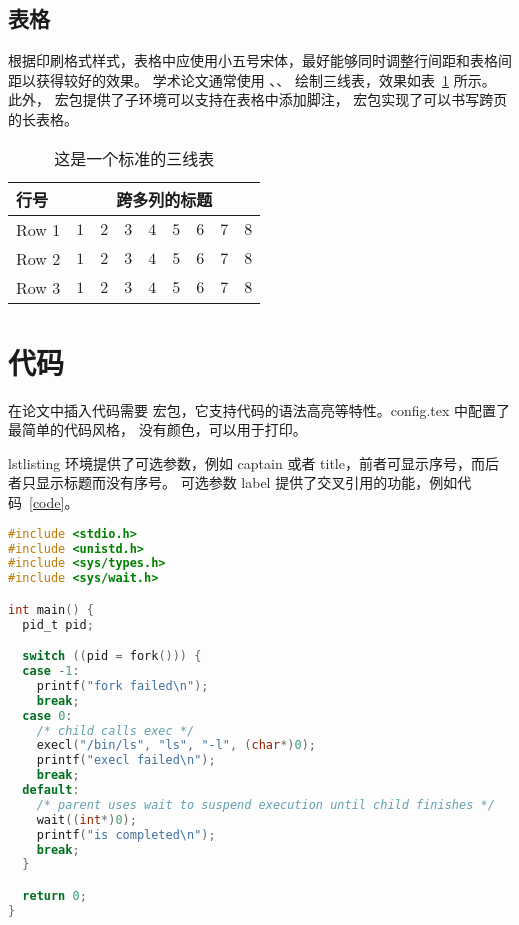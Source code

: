 \subsection{表格}

根据印刷格式样式，表格中应使用小五号宋体，最好能够同时调整行间距和表格间距以获得较好的效果。
学术论文通常使用 、、 绘制三线表，效果如表~\ref{tab:sample} 所示。
此外， 宏包提供了子环境可以支持在表格中添加脚注， 宏包实现了可以书写跨页
的长表格。

\begin{table}[!htbp]
  \caption{这是一个标准的三线表}\label{tab:sample}
  \centering
  \footnotesize%
  \setlength{\tabcolsep}{4pt}%
  \renewcommand{\arraystretch}{1.2}%
  \begin{tabular}{lcccccccc}
      \toprule
      行号 & \multicolumn{8}{c}{跨多列的标题}\\
      \midrule
      Row 1 & $1$ & $2$ & $3$ & $4$ & $5$ & $6$ & $7$ & $8$\\
      Row 2 & $1$ & $2$ & $3$ & $4$ & $5$ & $6$ & $7$ & $8$\\
      Row 3 & $1$ & $2$ & $3$ & $4$ & $5$ & $6$ & $7$ & $8$\\
      \bottomrule
  \end{tabular}
\end{table}

\section{代码}

在论文中插入代码需要  宏包，它支持代码的语法高亮等特性。config.tex 中配置了最简单的代码风格，
没有颜色，可以用于打印。

lstlisting 环境提供了可选参数，例如 captain 或者 title，前者可显示序号，而后者只显示标题而没有序号。
可选参数 label 提供了交叉引用的功能，例如代码~\ref{code}。

\begin{lstlisting}[language=C,caption=代码样例,label=code]
#include <stdio.h>
#include <unistd.h>
#include <sys/types.h>
#include <sys/wait.h>

int main() {
  pid_t pid;

  switch ((pid = fork())) {
  case -1:
    printf("fork failed\n");
    break;
  case 0:
    /* child calls exec */
    execl("/bin/ls", "ls", "-l", (char*)0);
    printf("execl failed\n");
    break;
  default:
    /* parent uses wait to suspend execution until child finishes */
    wait((int*)0);
    printf("is completed\n");
    break;
  }

  return 0;
}\end{lstlisting}


